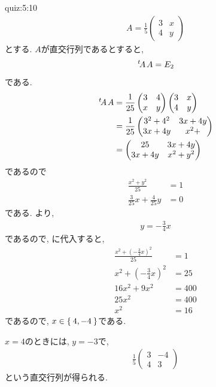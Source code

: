 \begin{answerof}{quiz:5:10}
  \begin{align*}
    A=\frac{1}{5}\begin{pmatrix}3&x\\4&y\end{pmatrix}
  \end{align*}
  とする.
  $A$が直交行列であるとすると,
  \begin{align*}
    {\left.^{t}\!A\right.}A=E_2
  \end{align*}
  である.
  \begin{align*}
    {\left.^{t}\!A\right.}A
    &=\frac{1}{25}\begin{pmatrix}3&4\\x&y\end{pmatrix}\begin{pmatrix}3&x\\4&y\end{pmatrix}\\
    &=\frac{1}{25}\begin{pmatrix}3^2+4^2&3x+4y\\3x+4y&x^2+\end{pmatrix}\\
    &=\begin{pmatrix}25&3x+4y\\3x+4y&x^2+y^2\end{pmatrix}
  \end{align*}
  であるので
  \begin{align}
    \frac{x^2+y^2}{25}&=1\label{orthomat:eq1}\\
    \frac{3}{25}x+\frac{4}{25}y&=0
    \label{orthomat:eq2}
  \end{align}
  である.
  より, 
  \begin{align*}
    y=-\frac{3}{4}x
  \end{align*}
  であるので, に代入すると,
  \begin{align*}
    \frac{x^2+\left(-\frac{3}{4}x\right)^2}{25}&=1\\
    x^2+\left(-\frac{3}{4}x\right)^2&=25\\
    16x^2+9x^2&=400\\
    25x^2&=400\\
    x^2&=16
  \end{align*}
  であるので, $x\in\Set{4,-4}$である.

  $x=4$のときには,
  $y=-3$で,
  \begin{align*}
    \frac{1}{5}\begin{pmatrix}3&-4\\4&3\end{pmatrix}
  \end{align*}
  という直交行列が得られる.


\end{answerof}
